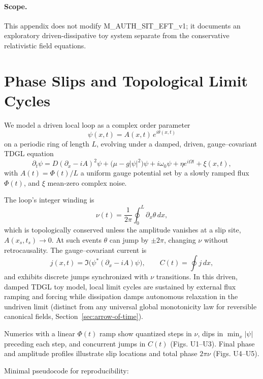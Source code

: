 \documentclass[american,11pt,letterpaper]{article}
\def\mathcal#1{#1}%
\def\texttt#1{#1}%
\begin{document}
\paragraph{Scope.} This appendix does not modify \texttt{M\_AUTH\_SIT\_EFT\_v1}; it documents an exploratory driven-dissipative toy system separate from the conservative relativistic field equations.

\section{Phase Slips and Topological Limit Cycles}

We model a driven local loop as a complex order parameter
\[
\psi(x,t)=A(x,t)\,e^{i\theta(x,t)}
\]
on a periodic ring of length \(L\), evolving under a damped, driven, gauge--covariant TDGL equation
\[
\partial_t \psi
= D(\partial_x - iA)^2 \psi + \big(\mu - g|\psi|^2\big)\psi
+ i\omega_0 \psi + \eta e^{i\Omega t} + \xi(x,t),
\]
with \(A(t)=\Phi(t)/L\) a uniform gauge potential set by a slowly ramped flux \(\Phi(t)\), and \(\xi\) mean-zero complex noise.

The loop's integer winding is
\[
\nu(t)=\frac{1}{2\pi}\oint_0^L \partial_x \theta\,dx,
\]
which is topologically conserved unless the amplitude vanishes at a slip site, \(A(x_s,t_s)\to 0\). At such events \(\theta\) can jump by \(\pm 2\pi\), changing \(\nu\) without retrocausality. The gauge--covariant current is
\[
j(x,t)=\Im\!\Big(\psi^*(\partial_x - iA)\psi\Big), \qquad
\mathcal{C}(t)=\oint j\,dx,
\]
and exhibits discrete jumps synchronized with \(\nu\) transitions. In this driven, damped TDGL toy model, local limit cycles are sustained by external flux ramping and forcing while dissipation damps autonomous relaxation in the undriven limit (distinct from any universal global monotonicity law for reversible canonical fields, Section~\ref{sec:arrow-of-time}).

Numerics with a linear \(\Phi(t)\) ramp show quantized steps in \(\nu\), dips in \(\min_x|\psi|\) preceding each step, and concurrent jumps in \(\mathcal{C}(t)\) (Figs. U1--U3). Final phase and amplitude profiles illustrate slip locations and total phase \(2\pi\nu\) (Figs. U4--U5).

Minimal pseudocode for reproducibility:
\end{document}
